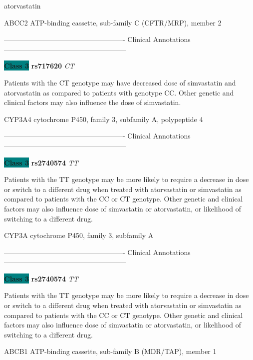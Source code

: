 \documentclass{resume} %
\begin{document}
\begin{rSection}{ atorvastatin }
\begin{rSubsection}{ ABCC2 }{ ATP-binding cassette, sub-family C (CFTR/MRP), member 2 }{}{}
\item[] ---------------------------------------------------- Clinical Annotations -----------------------------------------------------\newline
\item \textbf{\colorbox{teal} {Class 3}} \textbf{ rs717620 } \textit{ CT }
\item[] Patients with the CT genotype may have decreased dose of simvastatin and atorvastatin as compared to patients with genotype CC. Other genetic and clinical factors may also influence the dose of simvastatin.
\end{rSubsection}\begin{rSubsection}{ CYP3A4 }{ cytochrome P450, family 3, subfamily A, polypeptide 4 }{}{}
\item[]

\item[] ---------------------------------------------------- Clinical Annotations -----------------------------------------------------\newline
\item \textbf{\colorbox{teal} {Class 3}} \textbf{ rs2740574 } \textit{ TT }
\item[] Patients with the TT genotype may be more likely to require a decrease in dose or switch to a different drug when treated with atorvastatin or simvastatin as compared to patients with the CC or CT genotype. Other genetic and clinical factors may also influence dose of simvastatin or atorvastatin, or likelihood of switching to a different drug.
\end{rSubsection}\begin{rSubsection}{ CYP3A }{ cytochrome P450, family 3, subfamily A }{}{}
\item[]

\item[] ---------------------------------------------------- Clinical Annotations -----------------------------------------------------\newline
\item \textbf{\colorbox{teal} {Class 3}} \textbf{ rs2740574 } \textit{ TT }
\item[] Patients with the TT genotype may be more likely to require a decrease in dose or switch to a different drug when treated with atorvastatin or simvastatin as compared to patients with the CC or CT genotype. Other genetic and clinical factors may also influence dose of simvastatin or atorvastatin, or likelihood of switching to a different drug.
\end{rSubsection}\begin{rSubsection}{ ABCB1 }{ ATP-binding cassette, sub-family B (MDR/TAP), member 1 }{}{}
\item[]


\end{rSubsection}
\end{rSection}
\end{document}
